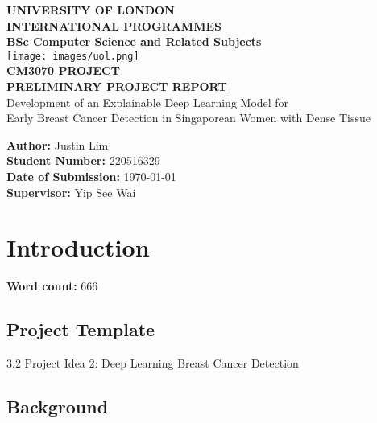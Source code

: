\documentclass[12pt]{article}
\begin{document}
\begin{titlepage}
    \centering
    \vspace*{2cm}

    {\LARGE\bfseries UNIVERSITY OF LONDON \\[0.5em]
    \large INTERNATIONAL PROGRAMMES}\\[2em]

    {\Large\bfseries BSc Computer Science and Related Subjects}\\[3em]

    \texttt{[image: images/uol.png]}\\[3em]

    {\Large\bfseries \underline{CM3070 PROJECT}\\
    \underline{PRELIMINARY PROJECT REPORT}}\\[3em]

    {\Large Development of an Explainable Deep Learning Model for}\\[0.5em]
    {\Large Early Breast Cancer Detection in Singaporean Women with Dense Tissue}\\[5em]

    \begin{flushleft}
        \textbf{Author:} Justin Lim\\
        \textbf{Student Number:} 220516329\\
        \textbf{Date of Submission:} \today\\
        \textbf{Supervisor:} Yip See Wai
    \end{flushleft}

    \vfill
\end{titlepage}

\newpage
\section{Introduction}
\label{chapter1}
\noindent\textbf{Word count:} 666
\vspace{1em}

\subsection{Project Template}
3.2 Project Idea 2: Deep Learning Breast Cancer Detection

\subsection{Background}
\end{document}
